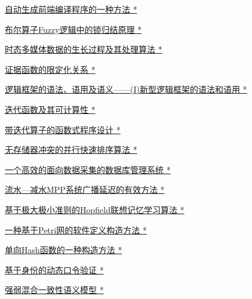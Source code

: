 \documentclass[a4paper]{article}
\begin{document}
\href{http://www.jos.org.cn/ch/reader/download_pdf.aspx?file_no=1996s128&year_id=1996&quarter_id=zk&falg=1}{自动生成前端编译程序的一种方法 *}

\href{http://www.jos.org.cn/ch/reader/download_pdf.aspx?file_no=1996s129&year_id=1996&quarter_id=zk&falg=1}{布尔算子Fuzzy逻辑中的锁归结原理 *}

\href{http://www.jos.org.cn/ch/reader/download_pdf.aspx?file_no=1996s130&year_id=1996&quarter_id=zk&falg=1}{时态多媒体数据的生长过程及其处理算法 *}

\href{http://www.jos.org.cn/ch/reader/download_pdf.aspx?file_no=1996s131&year_id=1996&quarter_id=zk&falg=1}{证据函数的限定化关系 *}

\href{http://www.jos.org.cn/ch/reader/download_pdf.aspx?file_no=1996s132&year_id=1996&quarter_id=zk&falg=1}{逻辑框架的语法、语用及语义——(I)新型逻辑框架的语法和语用 *}

\href{http://www.jos.org.cn/ch/reader/download_pdf.aspx?file_no=1996s133&year_id=1996&quarter_id=zk&falg=1}{迭代函数及其可计算性 *}

\href{http://www.jos.org.cn/ch/reader/download_pdf.aspx?file_no=1996s134&year_id=1996&quarter_id=zk&falg=1}{带迭代算子的函数式程序设计 *}

\href{http://www.jos.org.cn/ch/reader/download_pdf.aspx?file_no=1996s135&year_id=1996&quarter_id=zk&falg=1}{无存储器冲突的并行快速排序算法 *}

\href{http://www.jos.org.cn/ch/reader/download_pdf.aspx?file_no=1996s136&year_id=1996&quarter_id=zk&falg=1}{一个高效的面向数据采集的数据库管理系统 *}

\href{http://www.jos.org.cn/ch/reader/download_pdf.aspx?file_no=1996s137&year_id=1996&quarter_id=zk&falg=1}{流水—减水MPP系统广播延迟的有效方法 *}

\href{http://www.jos.org.cn/ch/reader/download_pdf.aspx?file_no=1996s138&year_id=1996&quarter_id=zk&falg=1}{基于极大极小准则的Hopfield联想记忆学习算法 *}

\href{http://www.jos.org.cn/ch/reader/download_pdf.aspx?file_no=1996s139&year_id=1996&quarter_id=zk&falg=1}{一种基于Petri网的软件定义构造方法 *}

\href{http://www.jos.org.cn/ch/reader/download_pdf.aspx?file_no=1996s140&year_id=1996&quarter_id=zk&falg=1}{单向Hash函数的一种构造方法 *}

\href{http://www.jos.org.cn/ch/reader/download_pdf.aspx?file_no=1996s141&year_id=1996&quarter_id=zk&falg=1}{基于身份的动态口令验证 *}

\href{http://www.jos.org.cn/ch/reader/download_pdf.aspx?file_no=1996s142&year_id=1996&quarter_id=zk&falg=1}{强弱混合一致性语义模型 *}
\end{document}
